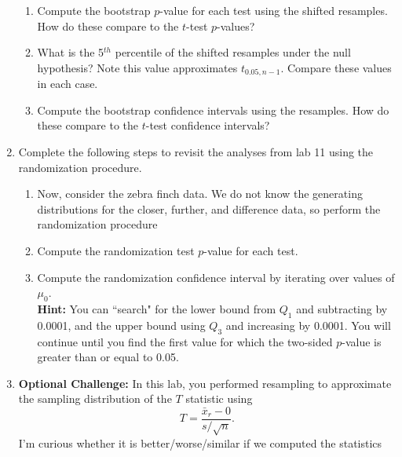 \documentclass{article}\usepackage[]{graphicx}\usepackage[]{xcolor}
\begin{document}
\begin{enumerate}
\begin{enumerate}
  \item Compute the bootstrap $p$-value for each test using the shifted resamples. 
  How do these compare to the $t$-test $p$-values?
    \item What is the 5$^{th}$ percentile of the shifted resamples under the null hypothesis? 
  Note this value approximates $t_{0.05, n-1}$. Compare these values in each case.
  \item Compute the bootstrap confidence intervals using the resamples. How do these 
  compare to the $t$-test confidence intervals?
\end{enumerate}
\item Complete the following steps to revisit the analyses from lab 11 using the
randomization procedure.
\begin{enumerate}
\item Now, consider the zebra finch data. We do not know the generating distributions
for the closer, further, and difference data, so perform the randomization procedure
  \item Compute the randomization test $p$-value for each test.
  \item Compute the randomization confidence interval by iterating over values of $\mu_0$.\\
  \textbf{Hint:} You can ``search" for the lower bound from $Q_1$ and subtracting by 0.0001, 
  and the upper bound using $Q_3$ and increasing by 0.0001. You will continue until you find 
  the first value for which the two-sided $p$-value is greater than or equal to 0.05.
\end{enumerate}
\item \textbf{Optional Challenge:} In this lab, you performed resampling to 
approximate the sampling distribution of the $T$ statistic using
\[T = \frac{\bar{x}_r - 0}{s/\sqrt{n}}.\]
I'm curious whether it is better/worse/similar if we computed the statistics

\end{enumerate}
\end{document}
